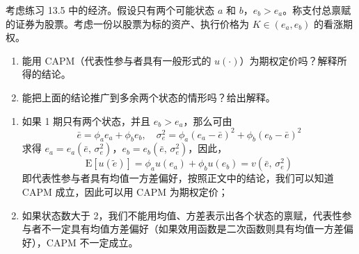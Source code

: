 \begin{problem}
 考虑练习 13.5 中的经济。假设只有两个可能状态 $a$ 和 $b$，$e_{b}>e_{a}$。称支付总禀赋的证券为股票。考虑一份以股票为标的资产、执行价格为 $K\in(e_{a},e_{b})$ 的看涨期权。
\begin{enumerate}[label=(\alph*)]
    \item 能用 CAPM（代表性参与者具有一般形式的 $u(\cdot)$）为期权定价吗？解释所得的结论。
    \item 能把上面的结论推广到多余两个状态的情形吗？给出解释。
\end{enumerate}
\end{problem}
\begin{solution}
\begin{enumerate}[label=(\alph*)]
    \item 如果 1 期只有两个状态，并且 $e_{b}>e_{a}$，那么可由
    \[
        \bar{e}=\phi_{a}e_{a}+\phi_{b}e_{b},\quad\sigma_{e}^{2}=\phi_{a}(e_{a}-\bar{e})^{2}+\phi_{b}(e_{b}-\bar{e})^{2}
    \]
    求得 $e_{a}=e_{a}(\bar{e},\,\sigma_{e}^{2})$，$e_{b}=e_{b}(\bar{e},\,\sigma_{e}^{2})$，因此，
    \[
        \mathrm{E}[u(\tilde{e})]=\phi_{a}u(e_{a})+\phi_{b}u(e_{b})=v(\bar{e},\,\sigma_{e}^{2})
    \]
    即代表性参与者具有均值一方差偏好，按照正文中的结论，我们可以知道 CAPM 成立，因此可以用 CAPM 为期权定价；
    \item 如果状态数大于 2，我们不能用均值、方差表示出各个状态的禀赋，代表性参与者不一定具有均值方差偏好（如果效用函数是二次函数则具有均值一方差偏好），CAPM 不一定成立。
\end{enumerate}
\end{solution}


